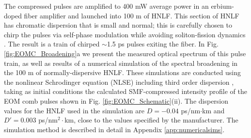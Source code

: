 The compressed pulses are amplified to 400 mW average power in an erbium-doped fiber amplifier and launched into 100 m of HNLF. This section of HNLF has chromatic dispersion that is small and normal; this is carefully chosen to chirp the pulses via self-phase modulation while avoiding soliton-fission dynamics \cite{Dudley2006}. The result is a train of chirped $\sim$1.5 ps pulses exiting the fiber.  In Fig. \ref{fig:EOMC_Broadening}a we present the measured optical spectrum of this pulse train, as well as results of a numerical simulation of the spectral broadening in the 100 m of normally-dispersive HNLF. These simulations are conducted using the nonlinear Schrodinger equation (NLSE) including third order dispersion \cite{Agrawal2007}, taking as initial conditions the calculated SMF-compressed intensity profile of the EOM comb pulses shown in Fig. \ref{fig:EOMC_Schematic}(ii). The dispersion values for the HNLF used in the simulation are $D=-0.04$  ps/nm$\cdot$km and $D'=0.003$ ps/nm$^2\cdot$km, close to the values specified by the manufacturer. The simulation method is described in detail in Appendix \ref{app:numericalsims}.




